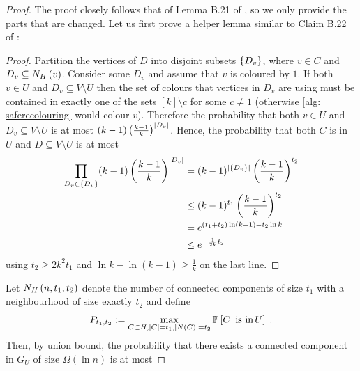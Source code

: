 \begin{proof}
    The proof closely follows that of Lemma B.21 of \cite{MR3536556-David16}, so we only provide the parts that are changed. Let us first prove a helper lemma similar to Claim B.22 of \cite{MR3536556-David16}:
    \begin{proof}
        Partition the vertices of $D$ into disjoint subsets $\left\{D_{v}\right\}$, where $v\in C$ and $D_{v}\subseteq N_{H}\left(v\right)$. Consider some $D_{v}$ and assume that $v$ is coloured by $1$. If both $v\in U$ and $D_{v}\subseteq V\setminus U$ then the set of colours that vertices in $D_{v}$ are using must be contained in exactly one
        of the sets $[k]\setminus {c}$ for some $c\neq 1$ (otherwise \cref{alg: saferecolouring} would colour $v$).
        Therefore the probability that both $v\in U$ and $D_{v}\subseteq V\setminus U$
        is at most $(k-1)\left(\frac{k-1}{k}\right)^{\left\lvert D_{v}\right\rvert}$. Hence, the probability that both $C$ is in $U$ and $D\subseteq V\setminus U$ is at most
        \begin{align*}
            \prod_{D_{v}\in\left\{ D_{v}\right\} }(k-1)\left(\frac{k-1}{k}\right)^{\left\lvert D_{v}\right\rvert} & =(k-1)^{\left\lvert\left\{ D_{v}\right\} \right\rvert}\left(\frac{k-1}{k}\right)^{t_2}\\
            & \le(k-1)^{t_1}\left(\frac{k-1}{k}\right)^{t_2}\\
            & =e^{(t_1+t_2)\ln(k-1)-t_2\ln{k}}\\
            & \le e^{-\frac{1}{2k}t_2}
        \end{align*}
        using $t_2\ge 2k^2t_1$ and $\ln{k}-\ln(k-1)\geq \frac1{k}$ on the last line.
    \end{proof}

    Let $N_{H}\left(n,t_1,t_2\right)$ denote the number of connected components of size $t_1$ with a neighbourhood of size exactly $t_2$ and define \[P_{t_1,t_2}:=\max_{C\subset H,\left\lvert C\right\rvert=t_1,\left\lvert N\left(C\right)\right\rvert=t_2}\operatorname*{\mathbb{P}}\left[\text{\ensuremath{C}\,\ is in\,\ensuremath{U}}\right]\;.\] Then, by union bound, the probability that there exists a connected component in $G_{U}$ of size $\Omega(\ln n)$ is at most
    

\end{proof}
